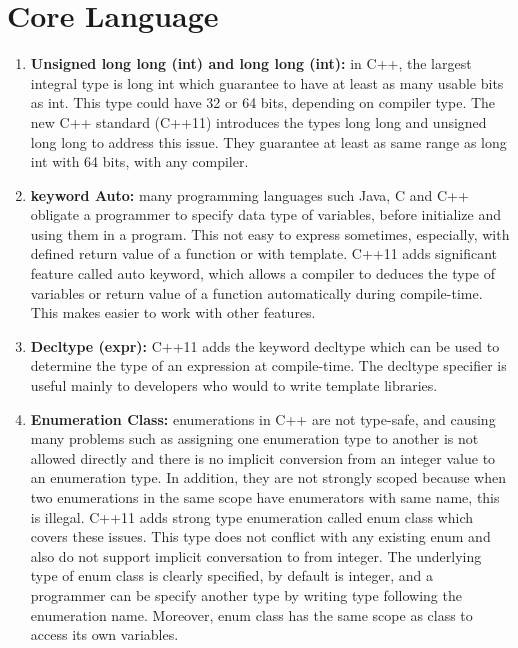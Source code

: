 \documentclass[12pt,a4paper]{report}
\begin{document}
\section{Core Language}
\label{section: core language}
 \begin{enumerate}
\item \textbf{Unsigned long long (int) and long long (int):} in C++, the largest integral type is long int which guarantee to have at least as many  usable bits as int. This type could have 32 or 64 bits, depending on compiler type. The new C++ standard (C++11) introduces the types long long and  unsigned long long to address this issue. They guarantee at least as same range as long int with 64 bits, with any compiler\cite{Gregorie:professionalcpp}.

\item \textbf{keyword Auto:} many programming languages such Java, C and C++ obligate a programmer to specify data type of variables, before initialize  and using them in a program. This not easy to express sometimes, especially, with defined return value of a function or with template. C++11 adds significant feature called auto keyword, which allows a compiler to deduces the type of variables or return value of a function automatically during compile-time. This makes easier to work with other features\cite{Prata:2012:Cpp}.

\item \textbf{Decltype (expr):} C++11 adds the keyword decltype which can be used to determine the type of an expression at compile-time. The decltype specifier is useful mainly to developers who would to write template libraries\cite{Gregorie:professionalcpp}.

\item  \textbf{Enumeration Class:} enumerations in C++ are not type-safe, and causing many problems such as assigning one enumeration type to another is not allowed directly and there is no implicit conversion from an integer value to an enumeration type. In addition, they are not strongly scoped because when two enumerations in the same scope have enumerators with same name, this is illegal. C++11 adds strong type enumeration called enum class which covers these issues. This type does not conflict with any existing enum and also do not support implicit conversation to from integer. The underlying type of enum class is clearly specified, by default is integer, and a programmer can be specify another type by writing type following the enumeration name. Moreover, enum class has the same scope as class to access its own variables\cite{Gregorie:professionalcpp}.
  

\end{enumerate}
\end{document}
